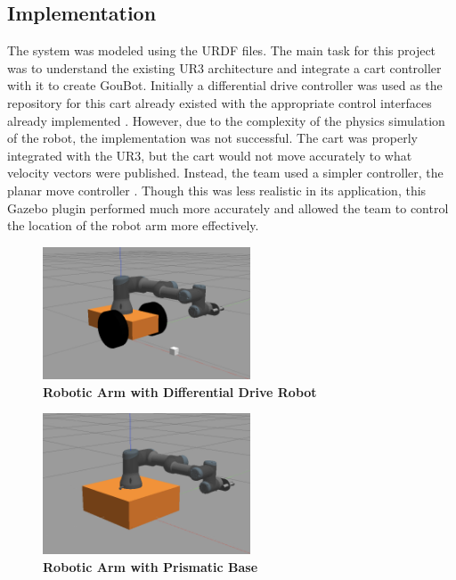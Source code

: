     \subsection{Implementation}
    
        The system was modeled using the URDF files. The main task for this project was to understand the existing UR3 architecture and integrate a cart controller with it to create GouBot. Initially a differential drive controller was used as the repository for this cart already existed with the appropriate control interfaces already implemented \cite{diff_drive_robot}. However, due to the complexity of the physics simulation of the robot, the implementation was not successful. The cart was properly integrated with the UR3, but the cart would not move accurately to what velocity vectors were published. Instead, the team used a simpler controller, the planar move controller \cite{planar_move_controller}. Though this was less realistic in its application, this Gazebo plugin performed much more accurately and allowed the team to control the location of the robot arm more effectively. 
        
        \begin{figure}[h]
        	\begin{center}
        	\includegraphics[width=0.55\textwidth]{pictures/diff_drive.png}
        	\caption{\textbf{Robotic Arm with Differential Drive Robot}}
        	\label{differential_drive_robot}
        	\end{center}
        \end{figure}
        
        \begin{figure}[h]
        	\begin{center}
        	\includegraphics[width=0.55\textwidth]{pictures/planar_prism.png}
        	\caption{\textbf{Robotic Arm with Prismatic Base}}
        	\label{prismatic_robot}
        	\end{center}
        \end{figure}
        
